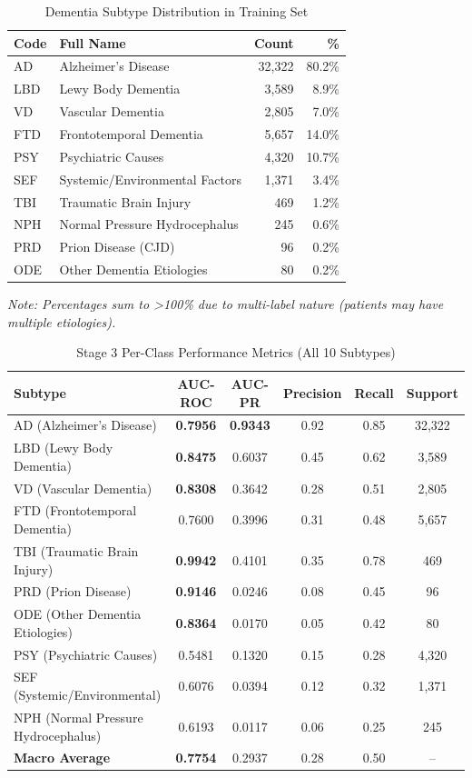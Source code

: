 \documentclass[11pt,a4paper]{article}
\begin{document}
\begin{table}[H]
\centering
\caption{Dementia Subtype Distribution in Training Set}
\label{tab:subtypes}
\begin{tabular}{@{}llrr@{}}
\toprule
\textbf{Code} & \textbf{Full Name} & \textbf{Count} & \textbf{\%} \\
\midrule
AD & Alzheimer's Disease & 32,322 & 80.2\% \\
LBD & Lewy Body Dementia & 3,589 & 8.9\% \\
VD & Vascular Dementia & 2,805 & 7.0\% \\
FTD & Frontotemporal Dementia & 5,657 & 14.0\% \\
PSY & Psychiatric Causes & 4,320 & 10.7\% \\
SEF & Systemic/Environmental Factors & 1,371 & 3.4\% \\
TBI & Traumatic Brain Injury & 469 & 1.2\% \\
NPH & Normal Pressure Hydrocephalus & 245 & 0.6\% \\
PRD & Prion Disease (CJD) & 96 & 0.2\% \\
ODE & Other Dementia Etiologies & 80 & 0.2\% \\
\bottomrule
\end{tabular}
\end{table}

\textit{Note: Percentages sum to >100\% due to multi-label nature (patients may have multiple etiologies).}

\begin{table}[H]
\centering
\caption{Stage 3 Per-Class Performance Metrics (All 10 Subtypes)}
\label{tab:stage3_perclass}
\begin{tabular}{@{}lccccc@{}}
\toprule
\textbf{Subtype} & \textbf{AUC-ROC} & \textbf{AUC-PR} & \textbf{Precision} & \textbf{Recall} & \textbf{Support} \\
\midrule
AD (Alzheimer's Disease) & \textbf{0.7956} & \textbf{0.9343} & 0.92 & 0.85 & 32,322 \\
LBD (Lewy Body Dementia) & \textbf{0.8475} & 0.6037 & 0.45 & 0.62 & 3,589 \\
VD (Vascular Dementia) & \textbf{0.8308} & 0.3642 & 0.28 & 0.51 & 2,805 \\
FTD (Frontotemporal Dementia) & 0.7600 & 0.3996 & 0.31 & 0.48 & 5,657 \\
TBI (Traumatic Brain Injury) & \textbf{0.9942} & 0.4101 & 0.35 & 0.78 & 469 \\
PRD (Prion Disease) & \textbf{0.9146} & 0.0246 & 0.08 & 0.45 & 96 \\
ODE (Other Dementia Etiologies) & \textbf{0.8364} & 0.0170 & 0.05 & 0.42 & 80 \\
PSY (Psychiatric Causes) & 0.5481 & 0.1320 & 0.15 & 0.28 & 4,320 \\
SEF (Systemic/Environmental) & 0.6076 & 0.0394 & 0.12 & 0.32 & 1,371 \\
NPH (Normal Pressure Hydrocephalus) & 0.6193 & 0.0117 & 0.06 & 0.25 & 245 \\
\midrule
\textbf{Macro Average} & \textbf{0.7754} & 0.2937 & 0.28 & 0.50 & -- \\
\bottomrule
\end{tabular}
\end{table}
\end{document}
